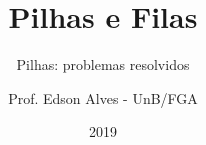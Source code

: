 \title{Pilhas e Filas}
\subtitle{Pilhas: problemas resolvidos}
\author{Prof. Edson Alves - UnB/FGA}
\date{2019}
